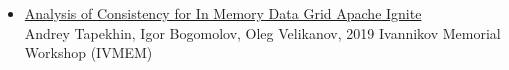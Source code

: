 \begin{itemize}
    \item \href{https://ieeexplore.ieee.org/document/8880744}{Analysis of Consistency for In Memory Data Grid Apache Ignite} \\
    Andrey Tapekhin, Igor Bogomolov, Oleg Velikanov, 2019 Ivannikov Memorial Workshop (IVMEM)
\end{itemize}

